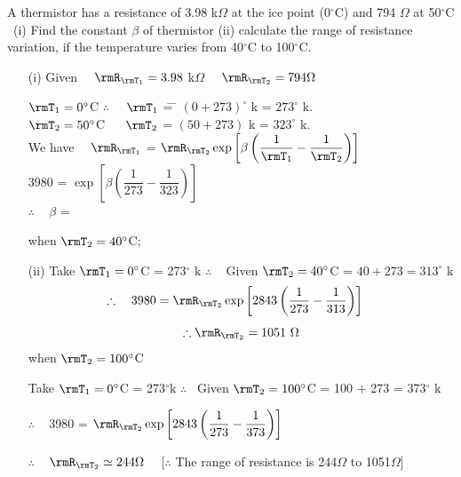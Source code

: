 \begin{problem}\label{prob9.2}
A thermistor has a resistance of 3.98 k$\Omega$ at the ice point
(0$^\circ$C) and 794 $\Omega$ at 50$^\circ$C ~(i) Find the constant
$\beta$ of thermistor (ii) calculate the range of resistance
variation, if the temperature varies from 40$^\circ$C to 100$^\circ$C.
\end{problem}

\begin{solution}
\begin{itemize}
\item[(i)] Given ~~$\rmR_{\rmT_1} =3.98$ k$\Omega$ ~~$\rmR_{\rmT_2} =794\Omega$
\begin{tabbing}
$\rmT_1 =0^\circ$C \quad $\therefore$~ ~$\rmT_1$ \= = \= $(0+273)^\circ$ k =
$273^\circ$ k.\\[7pt]
$\rmT_2 = 50^\circ$C \quad~~ $\rmT_2$ \> = \> $(50+273)$ k = $323^\circ$
k.\\[7pt]
We have \quad \quad~~$\rmR_{\rmT_1}$ \> = \>
$\rmR_{\rmT_2} \exp \left[\beta\left(\dfrac{1}{\rmT_1}
- \dfrac{1}{\rmT_2} \right)\right]$ \\[0.25cm]
\hspace{2cm} 3980 \> =  $\exp \left[\beta\left(\dfrac{1}{273}
-\dfrac{1}{323} \right) \right]$\\[7pt]
\hspace{2cm} $\therefore $ ~ $\beta$ \> = 
\end{tabbing}
when $\rmT_2 =40^\circ$C;

\item[(ii)] Take $\rmT_1 =0^\circ$C = 273$^\circ$ k \quad $\therefore$ ~
Given $\rmT_2 = 40^\circ$C = $40 + 273=313^\circ$ k
\begin{gather*}
\therefore \quad 3980
= \rmR_{\rmT_2} \exp \left[2843 \left(\frac{1}{273}
- \frac{1}{313} \right) \right]\quad \\[4pt]
\therefore \rmR_{\rmT_2} = 1051~ \Omega
\end{gather*}
when $\rmT_2 = 100^\circ$C

\eject

Take $\rmT_1=0^\circ$C = 273$^\circ$k \quad $\therefore$~ Given
$\rmT_2 = 100^\circ$C = 100 + 273 = 373$^\circ$ k

\smallskip
$\therefore$ ~ 3980 = $\rmR_{\rmT_2} \exp \left[2843 \left(\dfrac{1}{273}
- \dfrac{1}{373} \right) \right]$

\smallskip
$\therefore$ ~ $\rmR_{\rmT_2} \simeq 244\Omega$ ~~[$\therefore$ The range of
resistance is 244$\Omega$ to 1051$\Omega$]
\end{itemize}
\end{solution}

